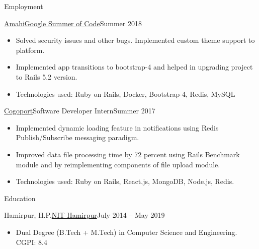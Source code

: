 \documentclass[]{mcdowellcv}
\begin{document}
	\makeheader
	
	\begin{cvsection}{Employment}
		\begin{cvsubsection}{\href {https://summerofcode.withgoogle.com/organizations/4708787353550848/}{Amahi}}{\href {https://summerofcode.withgoogle.com/}{Google Summer of Code}}{Summer 2018}
			\begin{itemize}
				\item Solved security issues and other bugs. Implemented custom theme support to platform.
				\item Implemented app transitions to bootstrap-4 and helped in upgrading project to Rails 5.2 version.
				\item Technologies used: Ruby on Rails, Docker, Bootstrap-4, Redis, MySQL
			\end{itemize}
		\end{cvsubsection}
		\begin{cvsubsection}{\href {http://www.cogoport.com/}{Cogoport}}{Software Developer Intern}{Summer 2017}			
			\begin{itemize}
				\item Implemented dynamic loading feature in notifications using Redis Publish/Subscribe messaging paradigm.
				\item Improved data file processing time by 72 percent using Rails Benchmark module and by reimplementing \newline components of file upload module.
				\item Technologies used: Ruby on Rails, React.js, MongoDB, Node.js, Redis.
			\end{itemize}
		\end{cvsubsection}
	\end{cvsection}
	
	\begin{cvsection}{Education}
		\begin{cvsubsection}{Hamirpur, H.P.}{\href {http://nith.ac.in/}{NIT Hamirpur}}{July 2014 -- May 2019}
			\begin{itemize}
				\item Dual Degree (B.Tech + M.Tech) in Computer Science and Engineering. CGPI: 8.4
			\end{itemize}
		\end{cvsubsection}
	\end{cvsection}
	
\end{document}
